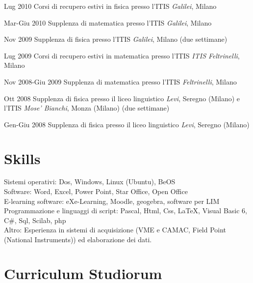 \begin{CV}
	\item[Lug 2010] Corsi di recupero estivi in fisica presso l'ITIS {\em Galilei}, Milano
	
	\item[Mar-Giu 2010] Supplenza di matematica presso l'ITIS {\em Galilei}, Milano
	
	\item[Nov 2009] Supplenza di fisica presso l'ITIS {\em Galilei}, Milano (due settimane)
	
	\item[Lug 2009] Corsi di recupero estivi in matematica presso l'ITIS {\em ITIS Feltrinelli}, Milano
	
	\item[Nov 2008-Giu 2009] Supplenza di matematica presso l'ITIS {\em Feltrinelli}, Milano
	
	\item[Ott 2008] Supplenza di fisica presso il liceo linguistico {\em Levi}, Seregno (Milano) e l'ITIS {\em Mose' Bianchi}, Monza (Milano) (due settimane)
	
	\item[Gen-Giu 2008] Supplenza di fisica presso il liceo linguistico {\em Levi}, Seregno (Milano)
	
\end{CV}

\section{Skills}
Sistemi operativi: Dos, Windows, Linux (Ubuntu), BeOS\\
Software: Word, Excel, Power Point, Star Office, Open Office\\
E-learning software: eXe-Learning, Moodle, geogebra, software per LIM\\
Programmazione e linguaggi di script: Pascal, Html, Css, \LaTeX, Visual Basic 6, C\#, Sql, Scilab, php\\
Altro: Esperienza in sistemi di acquisizione (VME e CAMAC, Field Point (National Instruments)) ed elaborazione dei dati.

\section{Curriculum Studiorum}

